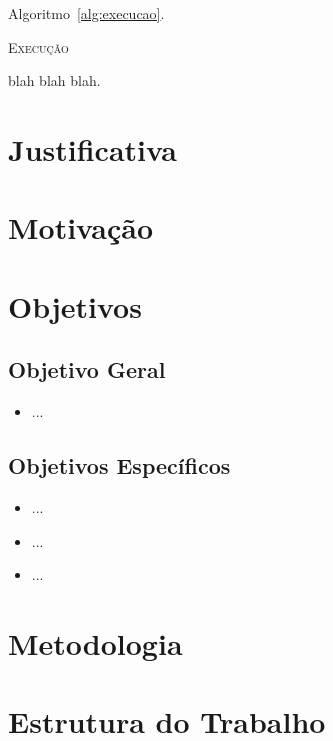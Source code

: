  Algoritmo~\ref{alg:execucao}.

\begin{algorithm}[H]
   \label{alg:execucao}
   \SetAlgoLined
   \caption{\textsc{Execução}}
\end{algorithm}


blah blah \cite{autor-titulo-ano} blah.

\section{Justificativa}

\section{Motivação}

\section{Objetivos}
\subsection{Objetivo Geral}
\begin{itemize}
\item ...
\end{itemize}

\subsection{Objetivos Específicos}
\begin{itemize}
\item ...
\item ...
\item ...
\end{itemize}

\section{Metodologia}

\section{Estrutura do Trabalho}
